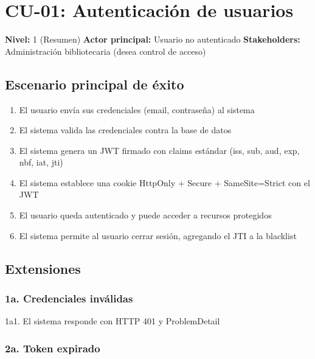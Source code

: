 \documentclass[
11pt,
a4paper,
]{report}
\providecommand{\tightlist}{%
	\setlength{\itemsep}{0pt}\setlength{\parskip}{0pt}}
\begin{document}
	\hypertarget{cu-01-autenticaciuxf3n-de-usuarios}{%
		\section{CU-01: Autenticación de usuarios}\label{cu-01-autenticaciuxf3n-de-usuarios}}
	
	\textbf{Nivel:} 1 (Resumen)
	\textbf{Actor principal:} Usuario no autenticado
	\textbf{Stakeholders:} Administración bibliotecaria (desea control de acceso)
	
	\hypertarget{escenario-principal-de-uxe9xito}{%
		\subsection{Escenario principal de éxito}\label{escenario-principal-de-uxe9xito}}
	
	\begin{enumerate}
		\def\labelenumi{\arabic{enumi}.}
		\tightlist
		\item
		El usuario envía sus credenciales (email, contraseña) al sistema
		\item
		El sistema valida las credenciales contra la base de datos
		\item
		El sistema genera un JWT firmado con claims estándar (iss, sub, aud, exp, nbf, iat, jti)
		\item
		El sistema establece una cookie HttpOnly + Secure + SameSite=Strict con el JWT
		\item
		El usuario queda autenticado y puede acceder a recursos protegidos
		\item
		El sistema permite al usuario cerrar sesión, agregando el JTI a la blacklist
	\end{enumerate}
	
	\hypertarget{extensiones}{%
		\subsection{Extensiones}\label{extensiones}}
	
	\hypertarget{a.-credenciales-invuxe1lidas}{%
		\subsubsection{1a. Credenciales inválidas}\label{a.-credenciales-invuxe1lidas}}
	
	1a1. El sistema responde con HTTP 401 y ProblemDetail
	
	\hypertarget{a.-token-expirado}{%
		\subsubsection{2a. Token expirado}\label{a.-token-expirado}}
	
\end{document}
